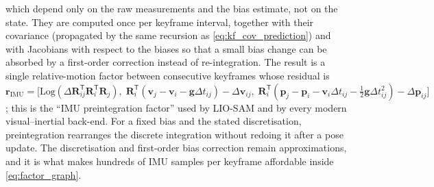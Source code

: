 which depend only on the raw measurements and the bias estimate, not on the state. They are computed once per keyframe interval, together with their covariance (propagated by the same recursion as \eqref{eq:kf_cov_prediction}) and with Jacobians with respect to the biases so that a small bias change can be absorbed by a first-order correction instead of re-integration. The result is a single relative-motion factor between consecutive keyframes whose residual is $\mathbf{r}_{\mathrm{IMU}}=\big[\mathrm{Log}(\Delta\mathbf{R}_{ij}^{\mathsf T}\mathbf{R}_i^{\mathsf T}\mathbf{R}_j),\;\mathbf{R}_i^{\mathsf T}(\mathbf{v}_j-\mathbf{v}_i-\mathbf{g}\Delta t_{ij})-\Delta\mathbf{v}_{ij},\;\mathbf{R}_i^{\mathsf T}(\mathbf{p}_j-\mathbf{p}_i-\mathbf{v}_i\Delta t_{ij}-\tfrac12\mathbf{g}\Delta t_{ij}^{2})-\Delta\mathbf{p}_{ij}\big]$; this is the ``IMU preintegration factor'' used by LIO-SAM \cite{shan2020_liosam} and by every modern visual--inertial back-end. For a fixed bias and the stated discretisation, preintegration rearranges the discrete integration without redoing it after a pose update. The discretisation and first-order bias correction remain approximations, and it is what makes hundreds of IMU samples per keyframe affordable inside \eqref{eq:factor_graph}.

